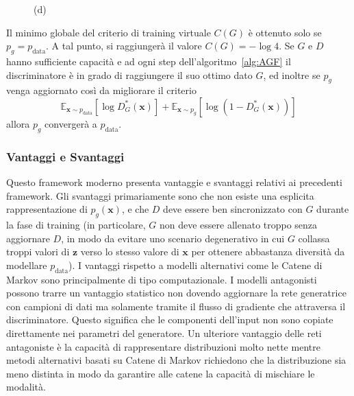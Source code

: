 \begin{figure}[p]
\begin{minipage}[b]{0.5\linewidth}
   (d) 
    \vspace{4ex}
  \end{minipage}
   \caption{\label{fig:intuition} }
 
\end{figure}

Il minimo globale del criterio di training virtuale $C(G)$ è ottenuto solo se $p_g=p_\text{data}$. 
A tal punto, si raggiungerà il valore $C(G) = -\log 4$. 
Se $G$ e $D$ hanno sufficiente capacità e ad ogni step dell'algoritmo~\ref{alg:AGF} il discriminatore è in grado di raggiungere il suo ottimo dato $G$, ed inoltre se $p_g$ venga aggiornato così da migliorare il criterio 
\[\mathbb{E}_{\bm{x} \sim p_\text{data}}[\log D^*_G(\bm{x})] + \mathbb{E}_{\bm{x} \sim p_g}[\log (1 - D^*_G(\bm{x}))]\] 
allora $p_g$ convergerà a $p_\text{data}$.

\subsubsection{Vantaggi e Svantaggi}
Questo framework moderno presenta vantaggie  e svantaggi relativi ai precedenti framework. Gli svantaggi primariamente sono che non esiste una esplicita rappresentazione di $p_g(\bm{x})$, e che $D$ deve essere ben sincronizzato con $G$ durante la fase di training (in particolare, $G$ non deve essere allenato troppo senza aggiornare $D$, in modo da evitare uno scenario degenerativo in cui $G$ collassa troppi valori di $\mathbf{z}$ verso lo stesso valore di $\mathbf{x}$ per ottenere abbastanza diversità da modellare $p_\text{data}$). 
I vantaggi rispetto a modelli alternativi come le Catene di Markov sono principalmente di tipo computazionale. I modelli antagonisti possono trarre un vantaggio statistico non dovendo aggiornare la rete generatrice con campioni di dati ma solamente tramite il flusso di gradiente che attraversa il discriminatore. Questo significa che le componenti dell'input non sono copiate direttamente nei parametri del generatore. Un ulteriore vantaggio delle reti antagoniste è la capacità di rappresentare distribuzioni molto nette mentre metodi alternativi basati su Catene di Markov richiedono che la distribuzione sia meno distinta in modo da garantire alle catene la capacità di mischiare le modalità.

